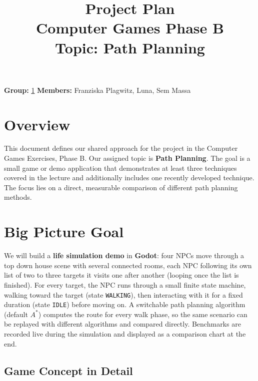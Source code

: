 \documentclass[11pt,a4paper]{article}
\title{\Huge\textbf{Project Plan}\\[0.3em]
\Large Computer Games \textendash{} Phase B\\[0.2em]
\large Topic: Path Planning}
\author{}
\date{}
\begin{document}
\maketitle
\thispagestyle{fancy}

\noindent
\textbf{Group:} \underline{1} \qquad
\textbf{Members:} Franziska Plagwitz, Luna, Sem Massa

\vspace{1em}

\section*{Overview}

This document defines our shared approach for the project in the Computer
Games Exercises, Phase B. Our assigned topic is \textbf{Path Planning}. The
goal is a small game or demo application that demonstrates at least three
techniques covered in the lecture and additionally includes one recently
developed technique. The focus lies on a direct, measurable comparison of
different path planning methods.

\section{Big Picture Goal}

We will build a \textbf{life simulation demo} in \textbf{Godot}: four NPCs
move through a top down house scene with several connected rooms, each
NPC following its own list of two to three targets it visits one after
another (looping once the list is finished). For every target, the NPC
runs through a small finite state machine, walking toward the target
(state \texttt{WALKING}), then interacting with it for a fixed duration
(state \texttt{IDLE}) before moving on. A switchable path planning
algorithm (default $A^*$) computes the route for every walk phase, so
the same scenario can be replayed with different algorithms and compared
directly. Benchmarks are recorded live during the simulation and
displayed as a comparison chart at the end.

\subsection{Game Concept in Detail}
\end{document}
